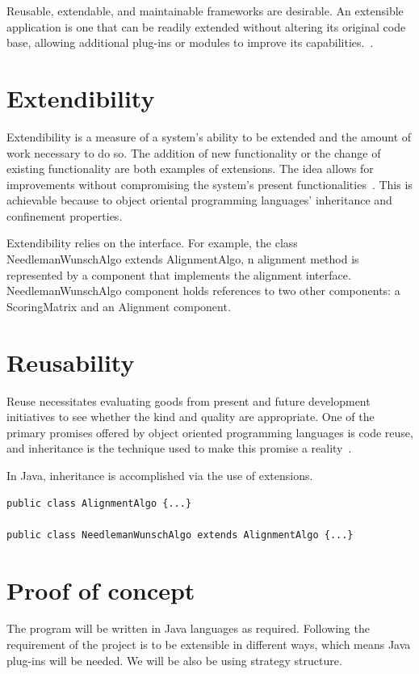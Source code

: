 \documentclass[]{final_report}
\begin{document}
Reusable, extendable, and maintainable frameworks are desirable. An extensible application is one that can be readily extended without altering its original code base, allowing additional plug-ins or modules to improve its capabilities.~\cite{freeman2020head}.

\section{Extendibility}
Extendibility is a measure of a system's ability to be extended and the amount of work necessary to do so. The addition of new functionality or the change of existing functionality are both examples of extensions. The idea allows for improvements without compromising the system's present functionalities~\cite{gewehr2007bioweka}.
This is achievable because to object oriental programming languages' inheritance and confinement properties.

Extendibility relies on the interface. For example, the class NeedlemanWunschAlgo extends AlignmentAlgo, n alignment method is represented by a component that implements the alignment interface.
NeedlemanWunschAlgo component holds references to two other components: a ScoringMatrix and an Alignment component.

\section{Reusability}
Reuse necessitates evaluating goods from present and future development initiatives to see whether the kind and quality are appropriate. One of the primary promises offered by object oriented programming languages is code reuse, and inheritance is the technique used to make this promise a reality~\cite{pfleeger2006software}.

In Java, inheritance is accomplished via the use of extensions.
\begin{verbatim}
public class AlignmentAlgo {...}

public class NeedlemanWunschAlgo extends AlignmentAlgo {...}
\end{verbatim}

\section{Proof of concept}
The program will be written in Java languages as required. Following the requirement of the project is to be extensible in different ways, which means Java plug-ins will be needed. We will be also be using strategy structure. 
\end{document}
